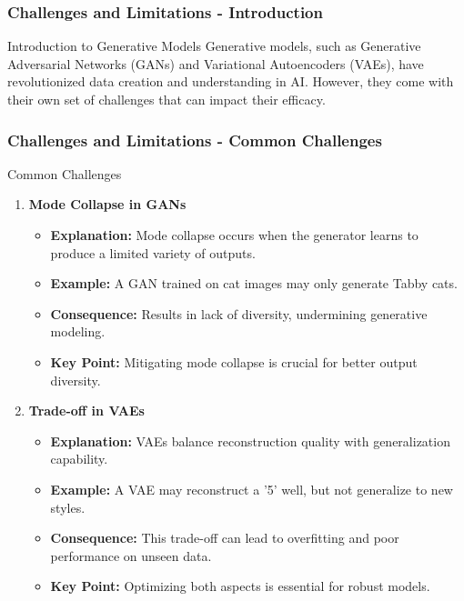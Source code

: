 \documentclass[aspectratio=169]{beamer}
\begin{document}
\begin{frame}[fragile]
    \frametitle{Challenges and Limitations - Introduction}
    \begin{block}{Introduction to Generative Models}
        Generative models, such as Generative Adversarial Networks (GANs) and Variational Autoencoders (VAEs), have revolutionized data creation and understanding in AI. However, they come with their own set of challenges that can impact their efficacy.
    \end{block}
\end{frame}

\begin{frame}[fragile]
    \frametitle{Challenges and Limitations - Common Challenges}
    \begin{block}{Common Challenges}
        \begin{enumerate}
            \item \textbf{Mode Collapse in GANs}
                \begin{itemize}
                    \item \textbf{Explanation:} Mode collapse occurs when the generator learns to produce a limited variety of outputs.
                    \item \textbf{Example:} A GAN trained on cat images may only generate Tabby cats.
                    \item \textbf{Consequence:} Results in lack of diversity, undermining generative modeling.
                    \item \textbf{Key Point:} Mitigating mode collapse is crucial for better output diversity.
                \end{itemize}
            \item \textbf{Trade-off in VAEs}
                \begin{itemize}
                    \item \textbf{Explanation:} VAEs balance reconstruction quality with generalization capability.
                    \item \textbf{Example:} A VAE may reconstruct a '5' well, but not generalize to new styles.
                    \item \textbf{Consequence:} This trade-off can lead to overfitting and poor performance on unseen data.
                    \item \textbf{Key Point:} Optimizing both aspects is essential for robust models.
                \end{itemize}
        \end{enumerate}
    \end{block}
\end{frame}
\end{document}
